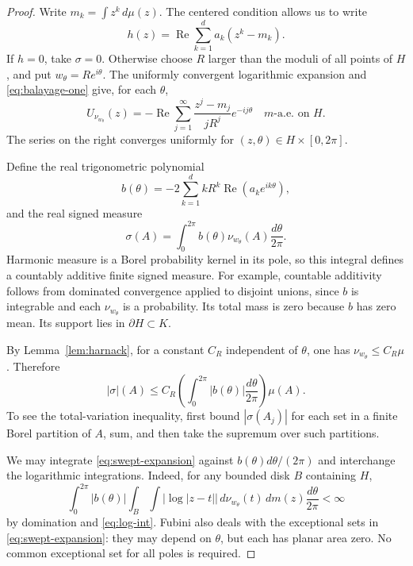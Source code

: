 \documentclass[10pt,a4paper]{amsart}
\DeclareMathOperator{\Rea}{Re}
\newcommand{\areaAE}{\text{a.e.}}
\begin{document}
\begin{proof}
Write $m_k=\int z^k\,d\mu(z)$. The centered condition allows us to
write
\begin{equation}\label{eq:h-expansion}
 h(z)=\Rea\sum_{k=1}^d a_k(z^k-m_k).
\end{equation}
If $h=0$, take $\sigma=0$. Otherwise choose $R$ larger than the
moduli of all points of $H$, and put $w_\theta=Re^{i\theta}$.
The uniformly convergent logarithmic expansion and
\eqref{eq:balayage-one} give, for each $\theta$,
\begin{equation}\label{eq:swept-expansion}
 U_{\nu_{w_\theta}}(z)
 =-\Rea\sum_{j=1}^{\infty}
       \frac{z^j-m_j}{jR^j}e^{-ij\theta}
 \quad m\text{-}\areaAE\text{ on }H.
\end{equation}
The series on the right converges uniformly for $(z,\theta)\in
H\times[0,2\pi]$.

Define the real trigonometric polynomial
\begin{equation}\label{eq:fourier-weight}
 b(\theta)=-2\sum_{k=1}^d kR^k\Rea(a_ke^{ik\theta}),
\end{equation}
and the real signed measure
\begin{equation}\label{eq:sigma}
 \sigma(A)=\int_0^{2\pi} b(\theta)\nu_{w_\theta}(A)
                          \frac{d\theta}{2\pi}.
\end{equation}
Harmonic measure is a Borel probability kernel in its pole, so this
integral defines a countably additive finite signed measure. For
example, countable additivity follows from dominated convergence
applied to disjoint unions, since $b$ is integrable and each
$\nu_{w_\theta}$ is a probability. Its total mass is zero because
$b$ has zero mean. Its support lies in $\partial H\subset K$.

By Lemma~\ref{lem:harnack}, for a constant $C_R$ independent of
$\theta$, one has $\nu_{w_\theta}\le C_R\mu$. Therefore
\begin{equation}\label{eq:variation-bound}
 |\sigma|(A)\le C_R\left(\int_0^{2\pi}|b(\theta)|
                       \frac{d\theta}{2\pi}\right)\mu(A).
\end{equation}
To see the total-variation inequality, first bound $|\sigma(A_j)|$
for each set in a finite Borel partition of $A$, sum, and then take
the supremum over such partitions.

We may integrate \eqref{eq:swept-expansion} against
$b(\theta)d\theta/(2\pi)$ and interchange the logarithmic integrations.
Indeed, for any bounded disk $B$ containing $H$,
\[
 \int_0^{2\pi}\!|b(\theta)|
 \int_B\!\int |\log|z-t||\,d\nu_{w_\theta}(t)\,dm(z)
 \frac{d\theta}{2\pi}<\infty
\]
by domination and \eqref{eq:log-int}. Fubini also deals with the
exceptional sets in \eqref{eq:swept-expansion}: they may depend on
$\theta$, but each has planar area zero. No common exceptional set
for all poles is required.


\end{proof}
\end{document}
